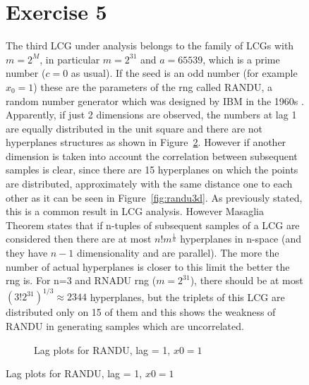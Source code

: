 \documentclass[10pt]{article}
\begin{document}
\begin{figure}
\section{Exercise 5}
The third LCG under analysis belongs to the family of LCGs with $m = 2^M$, in particular $m = 2^{31}$ and $a = 65539$, which is a prime number ($c = 0$ as usual). If the seed is an odd number (for example $x_0 = 1$) these are the parameters of the rng called RANDU, a random number generator which was designed by IBM in the 1960s \cite{kn}. Apparently, if just 2 dimensions are observed, the numbers at lag 1 are equally distributed in the unit square and there are not hyperplanes structures as shown in Figure~\ref{fig:randu2d}. However if another dimension is taken into account the correlation between subsequent samples is clear, since there are 15 hyperplanes on which the points are distributed, approximately with the same distance one to each other as it can be seen in Figure~\ref{fig:randu3d}. As previously stated, this is a common result in LCG analysis. However Masaglia Theorem states that if n-tuples of subsequent samples of a LCG are considered then there are at most $n!m^{\frac{1}{n}}$ hyperplanes in n-space (and they have $n-1$ dimensionality and are parallel). The more the number of actual hyperplanes is closer to this limit the better the rng is. For n=3 and RNADU rng ($m = 2^{31}$), there should be at most $(3! 2^{31})^{1/3} \approx 2344$ hyperplanes, but the triplets of this LCG are distributed only on 15 of them and this shows the weakness of RANDU in generating samples which are uncorrelated.

\begin{figure}
  \centering
  \caption{Lag plots for RANDU, lag = 1, $x0 = 1$}
  \label{fig:randu2d}
\end{figure}


\end{figure}
\end{document}
